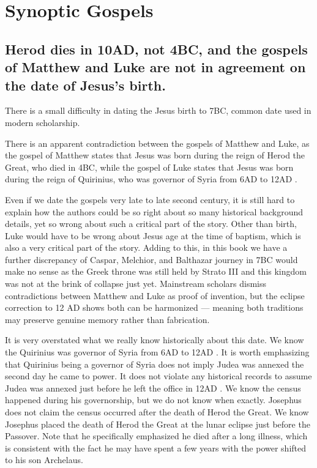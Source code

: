 \section{Synoptic Gospels}\label{sec:synoptic-gospels}

\subsection{Herod dies in 10AD, not 4BC, and the gospels of Matthew and Luke are not in agreement on the date of Jesus's birth.}\label{subsec:herod-dies-in-10ad-not-4bc-and-the-gospels-of-matthew-and-luke-are-not-in-agreement-on-the-date-of-jesuss-birth.}

There is a small difficulty in dating the Jesus birth to 7BC, common date used in modern scholarship.

There is an apparent contradiction between the gospels of Matthew and Luke, as the gospel of Matthew states that Jesus was born during the reign of Herod the Great, who died in 4BC, while the gospel of Luke states that Jesus was born during the reign of Quirinius, who was governor of Syria from 6AD to 12AD .

Even if we date the gospels very late to late second century, it is still hard to explain how the authors could be so right about so many historical background details, yet so wrong about such a critical part of the story.
Other than birth, Luke would have to be wrong about Jesus age at the time of baptism, which is also a very critical part of the story.
Adding to this, in this book we have a further discrepancy of Caspar, Melchior, and Balthazar journey in 7BC would make no sense as the Greek throne was still held by Strato III and this kingdom was not at the brink of collapse just yet.
Mainstream scholars dismiss contradictions between Matthew and Luke as proof of invention, but the eclipse correction to 12 AD shows both can be harmonized — meaning both traditions may preserve genuine memory rather than fabrication.

It is very overstated what we really know historically about this date.
We know the Quirinius was governor of Syria from 6AD to 12AD .
It is worth emphasizing that Quirinius being a governor of Syria does not imply Judea was annexed the second day he came to power.
It does not violate any historical records to assume Judea was annexed just before he left the office in 12AD .
We know the census happened during his governorship, but we do not know when exactly.
Josephus does not claim the census occurred after the death of Herod the Great.
We know Josephus placed the death of Herod the Great at the lunar eclipse just before the Passover.
Note that he specifically emphasized he died after a long illness, which is consistent with the fact he may have spent a few years with the power shifted to his son Archelaus.

